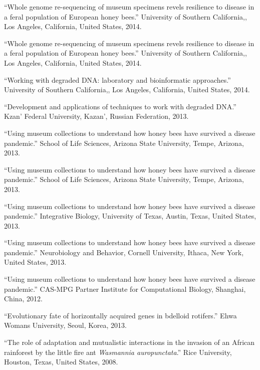 \documentclass[11pt]{article}
\def\printdate#1{\xprintdate#1-}
\def\xprintdate#1-#2-#3-{#1}
\begin{document}
\ind ``Whole genome re-sequencing of museum specimens revels resilience to
disease in a feral population of European honey bees.'' University of Southern California,, Los Angeles, California, United States, \printdate{2014-00-00}.


\ind ``Whole genome re-sequencing of museum specimens revels resilience to
disease in a feral population of European honey bees.'' University of Southern California,, Los Angeles, California, United States, \printdate{2014-00-00}.


\ind ``Working with degraded DNA: laboratory and bioinformatic approaches.'' University of Southern California,, Los Angeles, California, United States, \printdate{2014-00-00}.


\ind ``Development and applications of techniques to work with degraded DNA.'' Kzan' Federal University, Kazan', Russian Federation, \printdate{2013-00-00}.



\ind ``Using museum collections to understand how honey bees have survived a
disease pandemic.'' School of Life Sciences, Arizona State University, Tempe, Arizona, \printdate{2013-00-00}.


\ind ``Using museum collections to understand how honey bees have survived a
disease pandemic.'' School of Life Sciences, Arizona State University, Tempe, Arizona, \printdate{2013-00-00}.


\ind ``Using museum collections to understand how honey bees have survived a
disease pandemic.'' Integrative Biology, University of Texas, Austin, Texas, United States, \printdate{2013-00-00}.


\ind ``Using museum collections to understand how honey bees have survived a
disease pandemic.'' Neurobiology and Behavior, Cornell University, Ithaca, New York, United States, \printdate{2013-00-00}.


\ind ``Using museum collections to understand how honey bees have survived a
disease pandemic.'' CAS-MPG Partner Institute for Computational Biology, Shanghai, China, \printdate{2012-00-00}.




\ind ``Evolutionary fate of horizontally acquired genes in bdelloid rotifers.'' Ehwa Womans University, Seoul, Korea, \printdate{2013-00-00}.



\ind ``The role of adaptation and mutualistic interactions in the invasion of
an African rainforest by the little fire ant
\textit{Wasmannia auropunctata}.'' Rice University, Houston, Texas, United States, \printdate{2008-00-00}.
\end{document}
